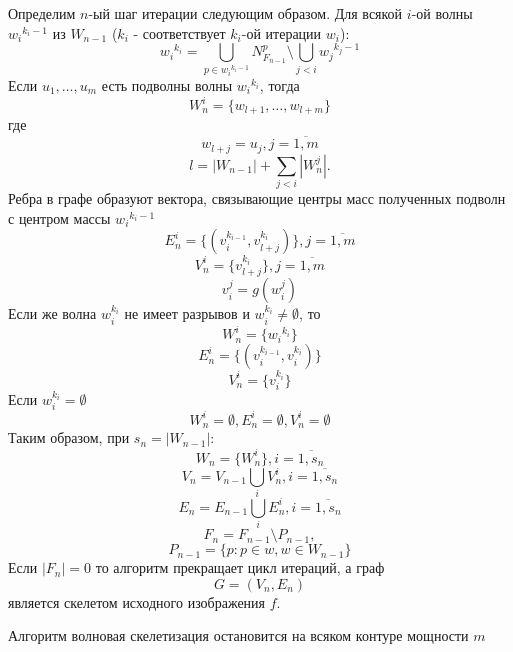 Определим $n$-ый шаг итерации следующим образом.
Для всякой $i$-ой волны ${w_i}^{k_i-1}$ из $W_{n-1}$ ($k_i$ - соответствует $k_i$-ой итерации $w_i$):
\begin{equation}
{w_i}^{k_i} = \bigcup_{p\in{w_i}^{k_i-1}}N_{F_{n-1}}^p\setminus\bigcup_{j<i}{w_j}^{k_j-1}
\label{skeleton1}
\end{equation}
Если $u_1,\ldots ,u_m$ есть подволны волны ${w_i}^{k_i}$, тогда
$$W^i_n=\{w_{l+1},\ldots ,w_{l+m}\}$$
где
$$w_{l+j}=u_j, j=\overline{1,m}$$
$$l = |W_{n-1}|+\sum\limits_{j<i}|W^j_n|.$$
Ребра в графе образуют вектора, связывающие центры масс полученных подволн с центром массы ${w_i}^{k_i-1}$
$$E^i_n=\{(v_{i}^{k_{i-1}}, v_{l+j}^{k_i})\}, j=\overline{1,m}$$
$$V^i_n=\{v_{l+j}^{k_i}\}, j=\overline{1,m}$$
$$v_i^j = g(w_i^j)$$
Если же волна $w_i^{k_i}$ не имеет разрывов и $w_i^{k_i}\neq\emptyset$, то
$$W^i_n=\{{w_i}^{k_i}\}$$
$$E^i_n=\{(v_{i}^{k_{i-1}}, v_{i}^{k_{i}})\}$$
$$V^i_n=\{v_{i}^{k_{i}}\}$$
Если $w_i^{k_i}=\emptyset$
$$W^i_n=\emptyset,E^i_n=\emptyset,V^i_n=\emptyset$$
Таким образом, при $s_n = |W_{n-1}|$:
$$W_{n} = \{W^i_n\}, i=\overline{1,s_n}$$
$$V_n = V_{n-1}\bigcup_i V^i_n, i=\overline{1,s_n}$$
$$E_n = E_{n-1}\bigcup_i{E^i_n}, i=\overline{1,s_n}$$
$$F_{n} = F_{n-1}\setminus P_{n-1},$$ 
$$P_{n-1} = \{p : p\in w, w \in W_{n-1}\}$$
Если $|F_{n}|=0$ то алгоритм прекращает цикл итераций, а граф
$$G = (V_n, E_n)$$
является скелетом исходного изображения $f$.\\

\begin{state} 
Алгоритм волновая скелетизация остановится на всяком контуре мощности $m$
\label{WaveSkeletizationState}
\end{state}

